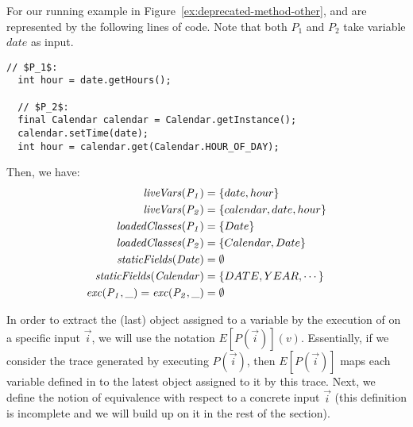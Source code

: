 \documentclass[sigconf,review,anonymous]{acmart}
\begin{document}
\begin{example}\label{ex:defs}
  For our running example in Figure~\ref{ex:deprecated-method-other},
   and  are represented by the following lines of code. Note that
  both $P_1$ and $P_2$ take variable $date$ as input.

\begin{lstlisting}[mathescape=true,showstringspaces=false]
  // $P_1$:
  int hour = date.getHours();

  // $P_2$:
  final Calendar calendar = Calendar.getInstance();
  calendar.setTime(date);
  int hour = calendar.get(Calendar.HOUR_OF_DAY);
\end{lstlisting}
%
Then, we have:
\[
\begin{aligned}[t]
  \mathit{{liveVars(P_1)}} &= \{date, hour\}\\
  \mathit{{liveVars(P_2)}} &= \{calendar, date, hour\}\\  
  \mathit{{loadedClasses(P_1)}} &= \{Date\} \\
  \mathit{{loadedClasses(P_2)}} &= \{Calendar, Date\} \\  
  \mathit{{staticFields(Date)}} &= \emptyset\\
  \mathit{{staticFields(Calendar)}} &= \{DATE, YEAR, \cdots\}\\
  \mathit{{exc(P_1, \_)}}=\mathit{{exc(P_2, \_)}} &=\emptyset
\end{aligned}
\]
\end{example}


In order to extract the (last) object assigned to a variable  by the execution of  on a specific input $\vec{i}$,
we will use the notation $E[P(\vec{i})](v)$. Essentially, if we consider the trace generated by executing $P(\vec{i})$,
then $E[P(\vec{i})]$ maps each variable defined in  to the latest object assigned to it by this trace.
Next, we define the notion of equivalence with respect to a concrete input $\vec{i}$ (this definition is incomplete and we will build up on it in the rest of the section).
\end{document}
